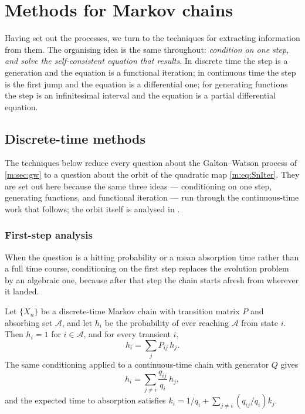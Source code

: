 \section{Methods for Markov chains}
\label{m:sec:methods}

Having set out the processes, we turn to the techniques for extracting information
from them. The organising idea is the same throughout: \emph{condition on one step,
and solve the self-consistent equation that results}. In discrete time the step is
a generation and the equation is a functional iteration; in continuous time the
step is the first jump and the equation is a differential one; for generating
functions the step is an infinitesimal interval and the equation is a partial
differential equation.

\subsection{Discrete-time methods}
\label{m:sec:dtmethods}

The techniques below reduce every question about the Galton--Watson process of
\cref{m:sec:gw} to a question about the orbit of the quadratic map
\cref{m:eq:SnIter}. They are set out here because the same three ideas ---
conditioning on one step, generating functions, and functional iteration --- run
through the continuous-time work that follows; the orbit itself is analysed in
\ChA.

\subsubsection{First-step analysis}
\label{m:sec:firststep}

When the question is a hitting probability or a mean absorption time rather than a
full time course, conditioning on the first step replaces the evolution problem by
an algebraic one, because after that step the chain starts afresh from wherever it
landed.

\begin{proposition}
\label{m:prop:firststep}
Let $\{X_n\}$ be a discrete-time Markov chain with transition matrix $P$ and
absorbing set $\mathcal A$, and let $h_i$ be the probability of ever reaching
$\mathcal A$ from state $i$. Then $h_i=1$ for $i\in\mathcal A$, and for every
transient $i$,
\begin{equation}
\label{m:eq:firststepdiscrete}
h_i = \sum_{j}P_{ij}\,h_j .
\end{equation}
The same conditioning applied to a continuous-time chain with generator $Q$ gives
\begin{equation}
\label{m:eq:firststep}
h_i = \sum_{j\neq i}\frac{q_{ij}}{q_i}\,h_j ,
\end{equation}
and the expected time to absorption satisfies
$k_i = 1/q_i + \sum_{j\neq i}(q_{ij}/q_i)k_j$.
\end{proposition}

